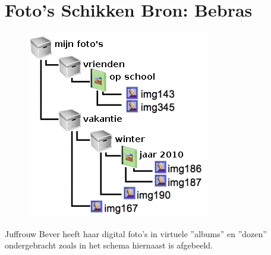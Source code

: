 \documentclass[12pt]{article}
\begin{document}
	\begin{minipage}{\textwidth}
		\section{Foto's Schikken \hfill\small Bron: Bebras}
			\begin{figure} 
				\includegraphics[width=\linewidth]{image3}
			\end{figure}
			
			Juffrouw Bever heeft haar digital foto's in virtuele ''albums'' en ''dozen'' ondergebracht zoals in het schema hiernaast is afgebeeld. \vspace{0.5cm}


\end{minipage}
\end{document}
